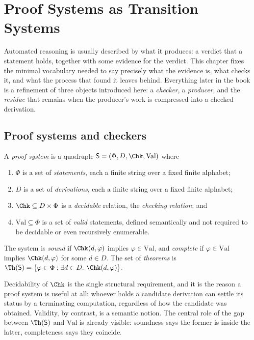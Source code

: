 \chapter{Proof Systems as Transition Systems}
\label{ch:proof-systems}

Automated reasoning is usually described by what it produces: a verdict that a statement holds, together with some evidence for the verdict. This chapter fixes the minimal vocabulary needed to say precisely what the evidence is, what checks it, and what the process that found it leaves behind. Everything later in the book is a refinement of three objects introduced here: a \emph{checker}, a \emph{producer}, and the \emph{residue} that remains when the producer's work is compressed into a checked derivation.

\section{Proof systems and checkers}

\begin{definition}
\label{def:proof-system}
A \emph{proof system} is a quadruple $\mathsf{S}=(\Phi,D,\Chk,\mathrm{Val})$ where
\begin{enumerate}[label=(\roman*),nosep]
\item $\Phi$ is a set of \emph{statements}, each a finite string over a fixed finite alphabet;
\item $D$ is a set of \emph{derivations}, each a finite string over a fixed finite alphabet;
\item $\Chk\subseteq D\times\Phi$ is a \emph{decidable} relation, the \emph{checking relation}; and
\item $\mathrm{Val}\subseteq\Phi$ is a set of \emph{valid} statements, defined semantically and not required to be decidable or even recursively enumerable.
\end{enumerate}
The system is \emph{sound} if $\Chk(d,\varphi)$ implies $\varphi\in\mathrm{Val}$, and \emph{complete} if $\varphi\in\mathrm{Val}$ implies $\Chk(d,\varphi)$ for some $d\in D$. The set of \emph{theorems} is $\Th(\mathsf{S})=\{\varphi\in\Phi:\exists d\in D.\ \Chk(d,\varphi)\}$.
\end{definition}

Decidability of $\Chk$ is the single structural requirement, and it is the reason a proof system is useful at all: whoever holds a candidate derivation can settle its status by a terminating computation, regardless of how the candidate was obtained. Validity, by contrast, is a semantic notion. The central role of the gap between $\Th(\mathsf{S})$ and $\mathrm{Val}$ is already visible: soundness says the former is inside the latter, completeness says they coincide.


